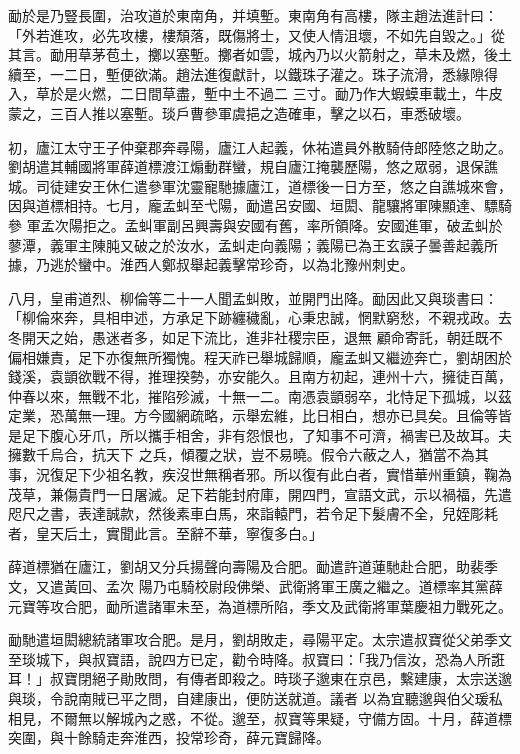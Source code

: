 \begin{pinyinscope}
 勔於是乃豎長圍，治攻道於東南角，并填塹。東南角有高樓，隊主趙法進計曰：「外若進攻，必先攻樓，樓頹落，既傷將士，又使人情沮壞，不如先自毀之。」從其言。勔用草茅苞土，擲以塞塹。擲者如雲，城內乃以火箭射之，草未及燃，後土續至，一二日，塹便欲滿。趙法進復獻計，以鐵珠子灌之。珠子流滑，悉緣隙得入，草於是火燃，二日間草盡，塹中土不過二
 三寸。勔乃作大蝦蟆車載土，牛皮蒙之，三百人推以塞塹。琰戶曹參軍虞挹之造確車，擊之以石，車悉破壞。



 初，廬江太守王子仲棄郡奔尋陽，廬江人起義，休祐遣員外散騎侍郎陸悠之助之。劉胡遣其輔國將軍薛道標渡江煽動群蠻，規自廬江掩襲歷陽，悠之眾弱，退保譙城。司徒建安王休仁遣參軍沈靈寵馳據廬江，道標後一日方至，悠之自譙城來會，因與道標相持。七月，龐孟虯至弋陽，勔遣呂安國、垣閎、龍驤將軍陳顯達、驃騎參
 軍孟次陽拒之。孟虯軍副呂興壽與安國有舊，率所領降。安國進軍，破孟虯於蓼潭，義軍主陳肫又破之於汝水，孟虯走向義陽；義陽已為王玄謨子曇善起義所據，乃逃於蠻中。淮西人鄭叔舉起義擊常珍奇，以為北豫州刺史。



 八月，皇甫道烈、柳倫等二十一人聞孟虯敗，並開門出降。勔因此又與琰書曰：「柳倫來奔，具相申述，方承足下跡纏穢亂，心秉忠誠，惘默窮愁，不親戎政。去冬開天之始，愚迷者多，如足下流比，進非社稷宗臣，退無
 顧命寄託，朝廷既不偏相嫌責，足下亦復無所獨愧。程天祚已舉城歸順，龐孟虯又繼迹奔亡，劉胡困於錢溪，袁顗欲戰不得，推理揆勢，亦安能久。且南方初起，連州十六，擁徒百萬，仲春以來，無戰不北，摧陷殄滅，十無一二。南憑袁顗弱卒，北恃足下孤城，以茲定業，恐萬無一理。方今國網疏略，示舉宏維，比日相白，想亦已具矣。且倫等皆是足下腹心牙爪，所以攜手相舍，非有怨恨也，了知事不可濟，禍害已及故耳。夫擁數千烏合，抗天下
 之兵，傾覆之狀，豈不易曉。假令六蔽之人，猶當不為其事，況復足下少祖名教，疾沒世無稱者邪。所以復有此白者，實惜華州重鎮，鞠為茂草，兼傷貴門一日屠滅。足下若能封府庫，開四門，宣語文武，示以禍福，先遣咫尺之書，表達誠款，然後素車白馬，來詣轅門，若令足下髮膚不全，兒姪彫耗者，皇天后土，實聞此言。至辭不華，寧復多白。」



 薛道標猶在廬江，劉胡又分兵揚聲向壽陽及合肥。勔遣許道蓮馳赴合肥，助裴季文，又遣黃回、孟次
 陽乃屯騎校尉段佛榮、武衛將軍王廣之繼之。道標率其黨薛元寶等攻合肥，勔所遣諸軍未至，為道標所陷，季文及武衛將軍葉慶祖力戰死之。



 勔馳遣垣閎總統諸軍攻合肥。是月，劉胡敗走，尋陽平定。太宗遣叔寶從父弟季文至琰城下，與叔寶語，說四方已定，勸令時降。叔寶曰：「我乃信汝，恐為人所誑耳！」叔寶閉絕子勛敗問，有傳者即殺之。時琰子邈東在京邑，繫建康，太宗送邈與琰，令說南賊已平之問，自建康出，便防送就道。議者
 以為宜聽邈與伯父瑗私相見，不爾無以解城內之惑，不從。邈至，叔寶等果疑，守備方固。十月，薛道標突圍，與十餘騎走奔淮西，投常珍奇，薛元寶歸降。




\end{pinyinscope}
